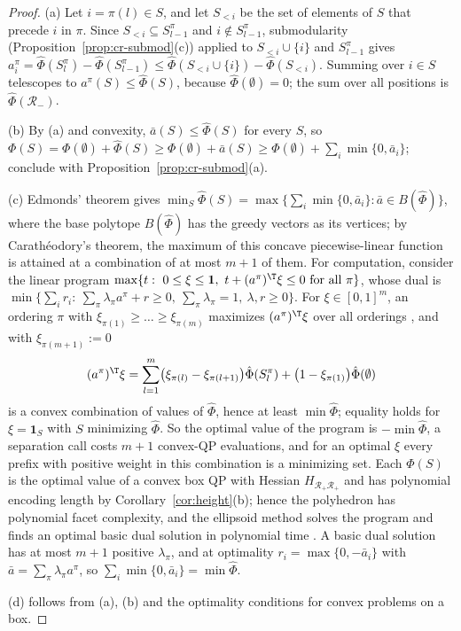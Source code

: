 \begin{proof}
(a) Let $i=\pi(l)\in S$, and let $S_{<i}$ be the set of elements of $S$
that precede $i$ in $\pi$. Since $S_{<i}\subseteq S^\pi_{l-1}$ and
$i\notin S^\pi_{l-1}$, submodularity (Proposition~\ref{prop:cr-submod}(c))
applied to $S_{<i}\cup\{i\}$ and $S^\pi_{l-1}$ gives
$a^\pi_i=\hat\Phi(S^\pi_l)-\hat\Phi(S^\pi_{l-1})
\le\hat\Phi(S_{<i}\cup\{i\})-\hat\Phi(S_{<i})$. Summing over $i\in S$
telescopes to $a^\pi(S)\le\hat\Phi(S)$, because $\hat\Phi(\emptyset)=0$;
the sum over all positions is $\hat\Phi(\mathcal R_-)$.

(b) By (a) and convexity, $\bar a(S)\le\hat\Phi(S)$ for every $S$, so
$\Phi(S)=\Phi(\emptyset)+\hat\Phi(S)\ge\Phi(\emptyset)+\bar a(S)
\ge\Phi(\emptyset)+\sum_i\min\{0,\bar a_i\}$; conclude with
Proposition~\ref{prop:cr-submod}(a).

(c) Edmonds' theorem gives
$\min_S\hat\Phi(S)=\max\{\sum_i\min\{0,\bar a_i\}:\bar a\in B(\hat\Phi)\}$,
where the base polytope $B(\hat\Phi)$ has the greedy vectors as its
vertices; by Carath\'eodory's theorem, the maximum of this concave
piecewise-linear function is attained at a combination of at most $m+1$ of
them. For
computation, consider the linear program
$\max\{t:\ 0\le\xi\le\mathbf 1,\ t+(a^\pi)^{\T}\xi\le0\ \text{for all }\pi\}$,
whose dual is $\min\{\sum_ir_i:\ \sum_\pi\lambda_\pi a^\pi+r\ge0,\
\sum_\pi\lambda_\pi=1,\ \lambda,r\ge0\}$. For $\xi\in[0,1]^m$, an ordering
$\pi$ with $\xi_{\pi(1)}\ge\dots\ge\xi_{\pi(m)}$ maximizes $(a^\pi)^{\T}\xi$
over all orderings \cite{Edmonds1970}, and with $\xi_{\pi(m+1)}:=0$
\[
(a^\pi)^{\T}\xi=\sum_{l=1}^m\bigl(\xi_{\pi(l)}-\xi_{\pi(l+1)}\bigr)
\hat\Phi(S^\pi_l)+\bigl(1-\xi_{\pi(1)}\bigr)\hat\Phi(\emptyset)
\]
is a convex combination of values of $\hat\Phi$, hence at least
$\min\hat\Phi$; equality holds for $\xi=\mathbf 1_S$ with $S$ minimizing
$\hat\Phi$. So the optimal value of the program is $-\min\hat\Phi$, a
separation call costs $m+1$ convex-QP evaluations, and for an optimal $\xi$
every prefix with positive weight in this combination is a minimizing set.
Each $\Phi(S)$ is the optimal value of a convex box QP with Hessian
$H_{\mathcal R_+\mathcal R_+}$ and has polynomial encoding length by
Corollary~\ref{cor:height}(b); hence the polyhedron has polynomial facet
complexity, and the ellipsoid method solves the program and finds an optimal
basic dual solution in polynomial time
\cite[Theorem~6.4.9, Lemma~6.5.15]{GrotschelLovaszSchrijver1988}. A basic
dual solution has at most $m+1$ positive $\lambda_\pi$, and at optimality
$r_i=\max\{0,-\bar a_i\}$ with $\bar a=\sum_\pi\lambda_\pi a^\pi$, so
$\sum_i\min\{0,\bar a_i\}=\min\hat\Phi$.

(d) follows from (a), (b) and the optimality conditions for convex problems
on a box.
\end{proof}

